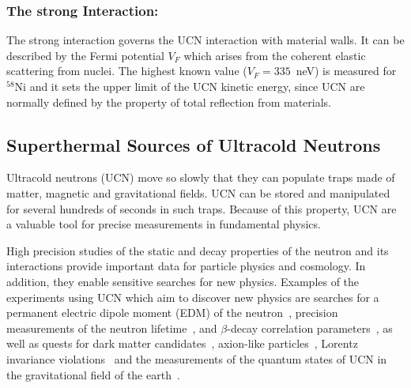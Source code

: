  \subsubsection{The strong Interaction:} The strong interaction governs the
 UCN interaction with material walls. It can be described by the Fermi
 potential $V_F$ which arises from the coherent elastic scattering
 from nuclei. The highest known value ($V_F=335$~neV) is measured for
 $^{58}$Ni and it sets the upper limit of the UCN kinetic energy,
 since UCN are normally defined by the property of total reflection
 from materials.

\subsection{Superthermal Sources of Ultracold Neutrons}
\label{sec:ucn_with_heII}




Ultracold neutrons (UCN) move so slowly that they can populate traps
made of matter, magnetic and gravitational fields. UCN can be stored
and manipulated for several hundreds of seconds in such traps. Because
of this property, UCN are a valuable tool for precise measurements in
fundamental physics.

High precision studies of the static and decay properties of the
neutron and its interactions provide important data for particle
physics and cosmology. In addition, they enable sensitive searches for
new physics. Examples of the experiments using UCN which aim to
discover new physics are searches for a permanent electric dipole
moment (EDM) of the
neutron~\cite{Baker2006,Serebrov2009,Lam_Gol,Altarev2010,Pendlebury2015},
precision measurements of the neutron
lifetime~\cite{Paul2009,Wietfeldt2011,Arzumanov2000,Serebrov2005,Huffman},
and $\beta$-decay correlation
parameters~\cite{Mendenhall,Broussard}, as well as quests for
dark matter
candidates~\cite{Ben2007,Serebrov2008,Zimmer2010},
axion-like
particles~\cite{Baessler,Serebrov2010,Jenke2014,Afach2015},
Lorentz invariance violations~\cite{Altarev2009} and the
measurements of the quantum states of UCN in the gravitational field
of the earth~\cite{Nesvizhevsky2003}.

